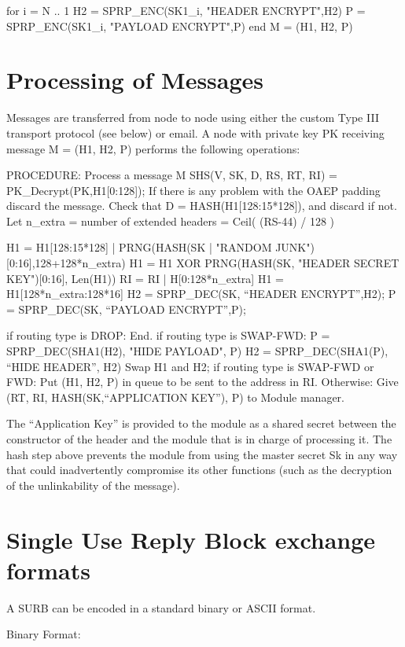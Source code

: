 	for i = N .. 1
		H2 = SPRP_ENC(SK1_i, "HEADER ENCRYPT",H2)
		P = SPRP_ENC(SK1_i, "PAYLOAD ENCRYPT",P)
	end
	M = (H1, H2, P)

\section{Processing of Messages}

Messages are transferred from node to node using either the custom Type
III transport protocol (see below) or email.  A node with private key
PK receiving message M = (H1, H2, P) performs the following operations:

PROCEDURE: Process a message M
	SHS(V, SK, D, RS, RT, RI) = PK_Decrypt(PK,H1[0:128]);
        If there is any problem with the OAEP padding discard the message.
        Check that D = HASH(H1[128:15*128]), and discard if not.
        Let n_extra = number of extended headers = Ceil( (RS-44) / 128 )
                  
        H1 = H1[128:15*128] | PRNG(HASH(SK | "RANDOM 
                                               JUNK")[0:16],128+128*n_extra)
	H1 = H1 XOR PRNG(HASH(SK, "HEADER SECRET KEY")[0:16], Len(H1))
        RI = RI | H[0:128*n_extra]
        H1 = H1[128*n_extra:128*16]
	H2 = SPRP_DEC(SK, ``HEADER ENCRYPT'',H2);
	P = SPRP_DEC(SK, ``PAYLOAD ENCRYPT'',P);

	if routing type is DROP:
                End.
	if routing type is SWAP-FWD:
                P = SPRP_DEC(SHA1(H2), "HIDE PAYLOAD", P)
		H2 = SPRP_DEC(SHA1(P), ``HIDE HEADER'', H2)
		Swap H1 and H2;
        if routing type is SWAP-FWD or FWD:
	   	Put (H1, H2, P) in queue to be sent to the address in RI.
        Otherwise:
		Give (RT, RI, HASH(SK,``APPLICATION KEY''), P) to
		Module manager. 

The ``Application Key'' is provided to the module as a shared secret
between the constructor of the header and the module that is in charge
of processing it.  The hash step above prevents the module from using
the master secret Sk in any way that could inadvertently compromise
its other functions (such as the decryption of the unlinkability of
the message).

\section{Single Use Reply Block exchange formats}

A SURB can be encoded in a standard binary or ASCII format.

Binary Format:

